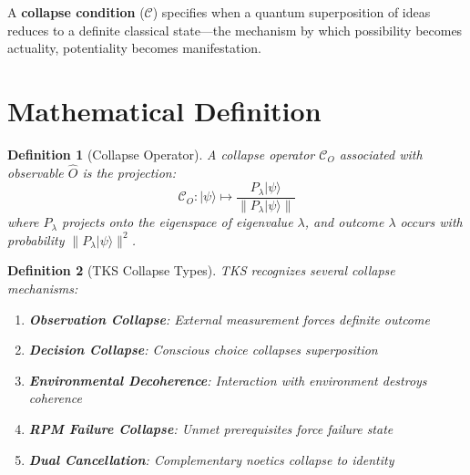 \documentclass[11pt,twoside]{book}
\newcommand{\Collapse}{\mathcal{C}}
\newtheorem{definition}{Definition}[chapter]
\begin{document}
\begin{tcolorbox}[colback=magenta!5!white,colframe=magenta!75!black,title=\textbf{Definition: Collapse Condition},breakable]
A \textbf{collapse condition} ($\Collapse$) specifies when a quantum superposition
of ideas reduces to a definite classical state---the mechanism by which possibility
becomes actuality, potentiality becomes manifestation.
\end{tcolorbox}

\section{Mathematical Definition}

\begin{definition}[Collapse Operator]
\label{def:collapse-op}
A \emph{collapse operator} $\Collapse_O$ associated with observable $\hat{O}$ is
the projection:
\[
    \Collapse_O : |\psi\rangle \mapsto \frac{P_\lambda |\psi\rangle}
    {\|P_\lambda |\psi\rangle\|}
\]
where $P_\lambda$ projects onto the eigenspace of eigenvalue $\lambda$, and outcome
$\lambda$ occurs with probability $\|P_\lambda |\psi\rangle\|^2$.
\end{definition}

\begin{definition}[TKS Collapse Types]
\label{def:collapse-types}
TKS recognizes several collapse mechanisms:
\begin{enumerate}[label=(\roman*)]
    \item \textbf{Observation Collapse}: External measurement forces definite outcome
    \item \textbf{Decision Collapse}: Conscious choice collapses superposition
    \item \textbf{Environmental Decoherence}: Interaction with environment destroys coherence
    \item \textbf{RPM Failure Collapse}: Unmet prerequisites force failure state
    \item \textbf{Dual Cancellation}: Complementary noetics collapse to identity
\end{enumerate}
\end{definition}
\end{document}
